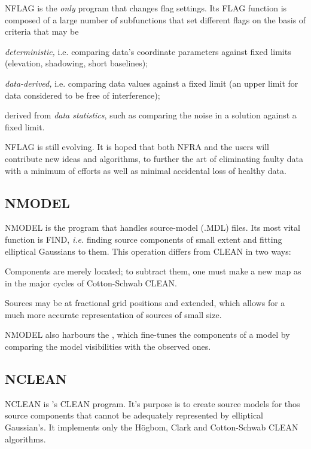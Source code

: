 	NFLAG is the {\em only} program that changes flag settings. Its FLAG
function is composed of a large number of subfunctions that set different flags
on the basis of criteria that may be

\bi
\item   {\em deterministic,} i.e. comparing data's coordinate parameters
against fixed limits (\eg elevation, shadowing, short baselines);

\item   {\em data-derived,} i.e. comparing data values against a fixed limit
(\eg an upper limit for data considered to be free of interference);

\item   derived from {\em data statistics}, such as comparing the noise in a
 solution against a fixed limit.
\ei

	NFLAG is still evolving. It is hoped that both NFRA and the \NEWSTAR
users will contribute new ideas and algorithms, to further the art of
eliminating faulty data with a minimum of efforts as well as minimal accidental
loss of healthy data.


\subsection{ NMODEL}
\label{.nmodel}

	NMODEL is the program that handles source-model (.MDL) files. Its most
vital function is FIND, {\em i.e.} finding source components of small extent
and fitting elliptical Gaussians to them. This operation differs from CLEAN in
two ways:

\bi
\item   Components are merely located; to subtract them, one must make a new
map as in the major cycles of Cotton-Schwab CLEAN.

\item   Sources may be at fractional grid positions and extended, which allows
for a much more accurate representation of sources of small size.
\ei

	NMODEL also harbours the , which
fine-tunes the components of a model by comparing the model visibilities with
the observed ones.


\subsection{ NCLEAN}
\label{.nclean}

	NCLEAN is \NEWSTAR's CLEAN program. It's purpose is to create source
models for thos source components that cannot be adequately represented by
elliptical Gaussian's. It implements only the H\"ogbom, Clark and Cotton-Schwab
CLEAN algorithms.


